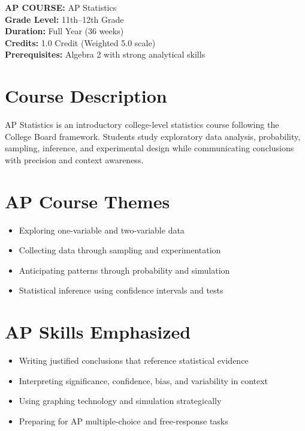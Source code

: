 \documentclass[12pt,oneside]{book}
\begin{document}
\noindent\textbf{AP COURSE:} AP Statistics\\
\textbf{Grade Level:} 11th--12th Grade\\
\textbf{Duration:} Full Year (36 weeks)\\
\textbf{Credits:} 1.0 Credit (Weighted 5.0 scale)\\
\textbf{Prerequisites:} Algebra 2 with strong analytical skills

\section{Course Description}
AP Statistics is an introductory college-level statistics course following the College Board framework.
Students study exploratory data analysis, probability, sampling, inference, and experimental design while
communicating conclusions with precision and context awareness.

\section{AP Course Themes}
\begin{itemize}[leftmargin=2em]
    \item Exploring one-variable and two-variable data
    \item Collecting data through sampling and experimentation
    \item Anticipating patterns through probability and simulation
    \item Statistical inference using confidence intervals and tests
\end{itemize}

\section{AP Skills Emphasized}
\begin{itemize}[leftmargin=2em]
    \item Writing justified conclusions that reference statistical evidence
    \item Interpreting significance, confidence, bias, and variability in context
    \item Using graphing technology and simulation strategically
    \item Preparing for AP multiple-choice and free-response tasks
\end{itemize}
\end{document}
